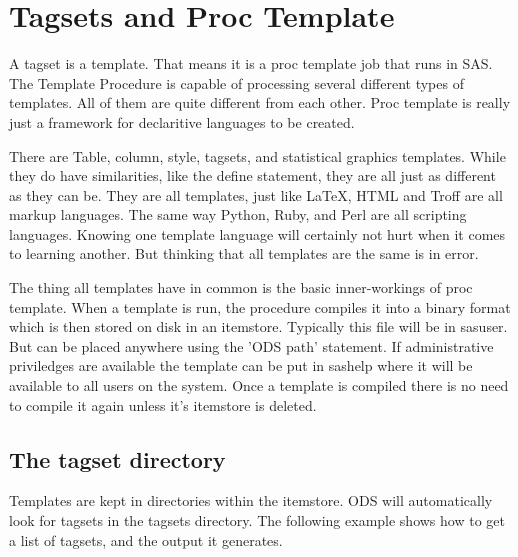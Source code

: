 \section{Tagsets and Proc Template}
A tagset is a template.  That means it is a proc template job that
runs in SAS.  The Template Procedure is capable of processing several different
types of templates.  All of them are quite different from each
other.  Proc template is really just a framework for declaritive languages
to be created. 

There are Table, column, style, tagsets, and statistical graphics templates.
While they do have similarities, like the define statement, they are all
just as different as they can be.  They are all templates, just like LaTeX, 
HTML and Troff are all markup languages.  The same way Python, Ruby, and Perl are
all scripting languages.  Knowing one template language will certainly not hurt
when it comes to learning another.  But thinking that all templates are the
same is in error. 

The thing all templates have in common is the basic inner-workings
of proc template. 
When a template is run, the procedure compiles
it into a binary format which is then stored on disk in an itemstore.
Typically this file will be in sasuser.  But can be placed anywhere
using the 'ODS path' statement.  If administrative priviledges are
available the template can be put in sashelp where it will be
available to all users on the system.  Once a template is compiled
there is no need to compile it again unless it's itemstore is
deleted.

\subsection{The tagset directory}
Templates are kept in directories within the itemstore.  ODS will automatically look for 
tagsets in the tagsets directory.  The following example shows how to get a list
of tagsets, and the output it generates.

